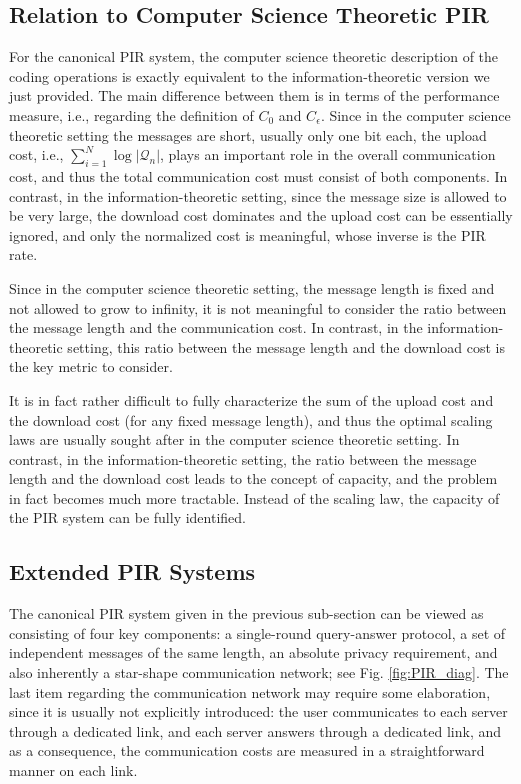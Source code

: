\subsection{Relation to Computer Science Theoretic PIR}

For the canonical PIR system, the computer science theoretic description of the coding operations is exactly equivalent to the information-theoretic version we just provided. The main difference between them is in terms of the performance measure, i.e., regarding the definition of $C_0$ and $C_{\epsilon}$. Since in the computer science theoretic setting the messages are short, usually only one bit each, the upload cost, i.e., $\sum_{i=1}^N\log |\mathcal{Q}_n|$, plays an important role in the overall communication cost, and thus the total communication cost must consist of both components. In contrast, in the information-theoretic setting, since the message size is allowed to be very large, the download cost dominates and the upload cost can be essentially ignored, and only the normalized cost is meaningful, whose inverse is the PIR rate. 

Since in the computer science theoretic setting, the message length is fixed and not allowed to grow to infinity, it is not meaningful to consider the ratio between the message length and the communication cost. In contrast, in the information-theoretic setting, this ratio between the message length and the download cost is the key metric to consider. 

It is in fact rather difficult to fully characterize the sum of the upload cost and the download cost (for any fixed message length), and thus the optimal scaling laws are usually sought after in the computer science theoretic setting. In contrast, in the information-theoretic setting, the ratio between the message length and the download cost leads to the concept of capacity, and the problem in fact becomes much more tractable. Instead of the scaling law, the capacity of the PIR system can be fully identified. 

\subsection{Extended PIR Systems} 

The canonical PIR system given in the previous sub-section can be viewed as consisting of four key components: a single-round query-answer protocol, a set of independent messages of the same length, an absolute privacy requirement, and also inherently a star-shape communication network; see Fig. \ref{fig:PIR_diag}. The last item regarding the communication network may require some elaboration, since it is usually not explicitly introduced: the user communicates to each server through a dedicated link, and each server answers through a dedicated link, and as a consequence, the communication costs are measured in a straightforward manner on each link. 

